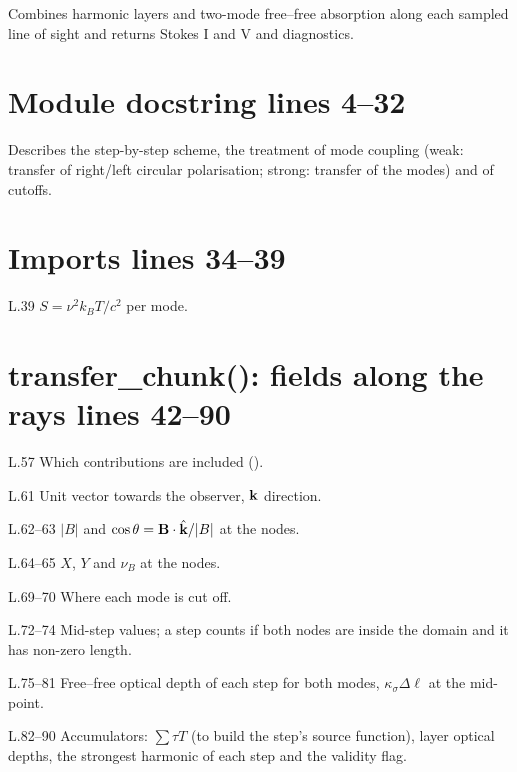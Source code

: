 Combines harmonic layers and two-mode free--free absorption along each sampled line
of sight and returns Stokes I and V and diagnostics.

\section*{\normalsize Module docstring \hfill{\small\mdseries\color{gray}lines 4--32}}

Describes the step-by-step scheme, the treatment of mode coupling (weak: transfer of right/left circular polarisation; strong: transfer of the modes) and of cutoffs.

\section*{\normalsize Imports \hfill{\small\mdseries\color{gray}lines 34--39}}

\begin{lines}
\item[L.39] $S=\nu^2k_BT/c^2$ per mode.
\end{lines}
\section*{\normalsize transfer\_chunk(): fields along the rays \hfill{\small\mdseries\color{gray}lines 42--90}}

\begin{lines}
\item[L.57] Which contributions are included ().
\item[L.61] Unit vector towards the observer, $\mathbf{k}$ direction.
\item[L.62–63] $|B|$ and $\cos\theta=\mathbf{B}\cdot\hat{\mathbf{k}}/|B|$ at the nodes.
\item[L.64–65] $X$, $Y$ and $\nu_B$ at the nodes.
\item[L.69–70] Where each mode is cut off.
\item[L.72–74] Mid-step values; a step counts if both nodes are inside the domain and it has non-zero length.
\item[L.75–81] Free--free optical depth of each step for both modes, $\kappa_\sigma\Delta\ell$ at the mid-point.
\item[L.82–90] Accumulators: $\sum\tau T$ (to build the step's source function), layer optical depths, the strongest harmonic of each step and the validity flag.
\end{lines}
